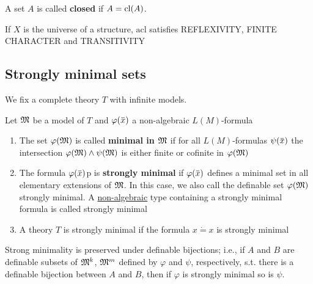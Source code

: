 \documentclass[11pt]{article}
\def \acl {\text{acl}}
\begin{document}
A set \(A\) is called \textbf{closed} if \(A=\operatorname{\text{cl}}(A)\).

\begin{lemma}[]
If \(X\) is the universe of a structure, \(\acl\) satisfies REFLEXIVITY, FINITE CHARACTER and TRANSITIVITY
\end{lemma}

\subsection{Strongly minimal sets}
\label{sec:org1c646a7}
We fix a complete theory \(T\) with infinite models.
\begin{definition}[]
Let \(\mathfrak{M}\) be a model of \(T\) and \(\varphi(\barx)\) a non-algebraic \(L(M)\)-formula
\begin{enumerate}
\item The set \(\varphi(\mathfrak{M})\) is called \textbf{minimal in \(\mathfrak{M}\)} if for all \(L(M)\)-formulas \(\psi(\barx)\) the
intersection \(\varphi(\mathfrak{M})\wedge\psi(\mathfrak{M})\) is either finite or cofinite in \(\varphi(\mathfrak{M})\)
\item The formula \(\varphi(\barx)\)p is \textbf{strongly minimal} if \(\varphi(\barx)\) defines a minimal set in all
elementary extensions of \(\mathfrak{M}\). In this case, we also call the definable set \(\varphi(\mathfrak{M})\)
strongly minimal. A \uline{non-algebraic} type containing a strongly minimal formula is called
strongly minimal
\item A theory \(T\) is strongly minimal if the formula \(x\dot=x\) is strongly minimal
\end{enumerate}
\end{definition}

Strong minimality is preserved under definable bijections; i.e., if \(A\) and \(B\) are
definable subsets of \(\mathfrak{M}^k\), \(\mathfrak{M}^m\) defined by \(\varphi\) and \(\psi\), respectively, s.t. there is a definable
bijection between \(A\) and \(B\), then if \(\varphi\) is strongly minimal so is \(\psi\).
\end{document}
